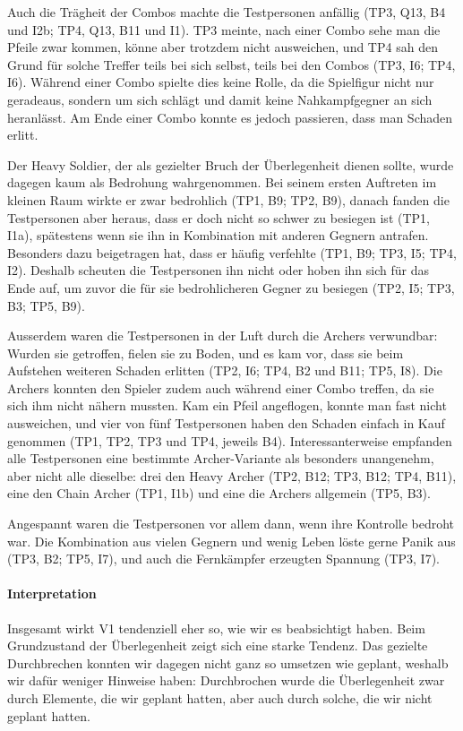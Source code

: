 \documentclass[../Main.tex]{subfiles}
\begin{document}
Auch die Trägheit der Combos machte die Testpersonen anfällig (TP3, Q13, B4 und I2b; TP4, Q13, B11 und I1). TP3 meinte, nach einer Combo sehe man die Pfeile zwar kommen, könne aber trotzdem nicht ausweichen, und TP4 sah den Grund für solche Treffer teils bei sich selbst, teils bei den Combos (TP3, I6; TP4, I6). Während einer Combo spielte dies keine Rolle, da die Spielfigur nicht nur geradeaus, sondern um sich schlägt und damit keine Nahkampfgegner an sich heranlässt. Am Ende einer Combo konnte es jedoch passieren, dass man Schaden erlitt.

Der Heavy Soldier, der als gezielter Bruch der Überlegenheit dienen sollte, wurde dagegen kaum als Bedrohung wahrgenommen. Bei seinem ersten Auftreten im kleinen Raum wirkte er zwar bedrohlich (TP1, B9; TP2, B9), danach fanden die Testpersonen aber heraus, dass er doch nicht so schwer zu besiegen ist (TP1, I1a), spätestens wenn sie ihn in Kombination mit anderen Gegnern antrafen. Besonders dazu beigetragen hat, dass er häufig verfehlte (TP1, B9; TP3, I5; TP4, I2). Deshalb scheuten die Testpersonen ihn nicht oder hoben ihn sich für das Ende auf, um zuvor die für sie bedrohlicheren Gegner zu besiegen (TP2, I5; TP3, B3; TP5, B9).

Ausserdem waren die Testpersonen in der Luft durch die Archers verwundbar: Wurden sie getroffen, fielen sie zu Boden, und es kam vor, dass sie beim Aufstehen weiteren Schaden erlitten (TP2, I6; TP4, B2 und B11; TP5, I8). Die Archers konnten den Spieler zudem auch während einer Combo treffen, da sie sich ihm nicht nähern mussten. Kam ein Pfeil angeflogen, konnte man fast nicht ausweichen, und vier von fünf Testpersonen haben den Schaden einfach in Kauf genommen (TP1, TP2, TP3 und TP4, jeweils B4). Interessanterweise empfanden alle Testpersonen eine bestimmte Archer-Variante als besonders unangenehm, aber nicht alle dieselbe: drei den Heavy Archer (TP2, B12; TP3, B12; TP4, B11), eine den Chain Archer (TP1, I1b) und eine die Archers allgemein (TP5, B3).

Angespannt waren die Testpersonen vor allem dann, wenn ihre Kontrolle bedroht war. Die Kombination aus vielen Gegnern und wenig Leben löste gerne Panik aus (TP3, B2; TP5, I7), und auch die Fernkämpfer erzeugten Spannung (TP3, I7).

\paragraph{Interpretation}
Insgesamt wirkt V1 tendenziell eher so, wie wir es beabsichtigt haben. Beim Grundzustand der Überlegenheit zeigt sich eine starke Tendenz. Das gezielte Durchbrechen konnten wir dagegen nicht ganz so umsetzen wie geplant, weshalb wir dafür weniger Hinweise haben: Durchbrochen wurde die Überlegenheit zwar durch Elemente, die wir geplant hatten, aber auch durch solche, die wir nicht geplant hatten.
\end{document}
